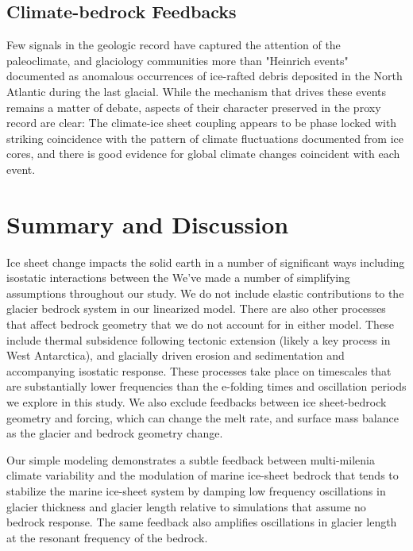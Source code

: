 \documentclass[tc, manuscript]{copernicus}
\begin{document}
\subsection{Climate-bedrock Feedbacks}


Few signals in the geologic record have captured the attention of the paleoclimate, and glaciology communities more than "Heinrich events" documented as anomalous occurrences of ice-rafted debris deposited in the North Atlantic during the last glacial.
While the mechanism that drives these events remains a matter of debate, aspects of their character preserved in the proxy record are clear:
The climate-ice sheet coupling appears to be phase locked with striking coincidence with the pattern of climate fluctuations documented from ice cores, and there is good evidence for global climate changes coincident with each event.


\section{Summary and Discussion}

Ice sheet change impacts the solid earth in a number of significant ways including isostatic interactions between the 
We've made a number of simplifying assumptions throughout our study. 
We do not include elastic contributions to the glacier bedrock system in our linearized model.
There are also other processes that affect bedrock geometry that we do not account for in either model.
These include thermal subsidence following tectonic extension (likely a key process in West Antarctica), and glacially driven erosion and sedimentation and accompanying isostatic response.
These processes take place on timescales that are substantially lower frequencies than the e-folding times and oscillation periods we explore in this study.
We also exclude feedbacks between ice sheet-bedrock geometry and forcing, which can change the melt rate, and surface mass balance as the glacier and bedrock geometry change.


\conclusions  
Our simple modeling demonstrates a subtle feedback between multi-milenia climate variability and the modulation of marine ice-sheet bedrock that tends to stabilize the marine ice-sheet system by damping low frequency oscillations in glacier thickness and glacier length relative to simulations that assume no bedrock response. 
The same feedback also amplifies oscillations in glacier length at the resonant frequency of the bedrock.


\end{document}
